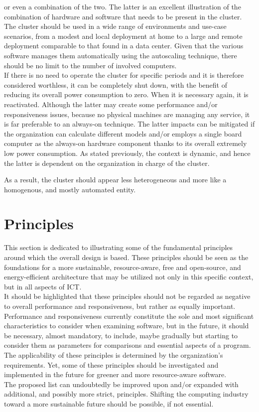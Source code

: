 or even a combination of the two. The latter is an excellent illustration of the
combination of hardware and software that needs to be present in the cluster. \\ %
The cluster should be used in a wide range of environments and use-case scenarios,
from a modest and local deployment at home to a large and remote deployment
comparable to that found in a data center. Given that the various software manages
them automatically using the autoscaling technique, there should be no limit to
the number of involved computers. \\ %
If there is no need to operate the cluster for specific periods and it is
therefore considered worthless, it can be completely shut down, with the benefit
of reducing its overall power consumption to zero. When it is necessary again,
it is reactivated. Although the latter may create some performance and/or responsiveness
issues, because no physical machines are managing any service, it is far preferable
to an always-on technique. The latter impacts can be mitigated if the
organization can calculate different models and/or employs a single board
computer as the always-on hardware component thanks to its overall extremely low
power consumption. As stated previously, the context is dynamic, and hence the latter
is dependent on the organization in charge of the cluster.

As a result, the cluster should appear less heterogeneous and more like a
homogenous, and mostly automated entity.

\section{Principles}
\label{sec:introduction_principles}

This section is dedicated to illustrating some of the fundamental principles
around which the overall design is based. These principles should be seen as the
foundations for a more sustainable, resource-aware, free and open-source, and
energy-efficient architecture that may be utilized not only in this specific
context, but in all aspects of ICT. \\ %
It should be highlighted that these principles should not be regarded as negative
to overall performance and responsiveness, but rather as equally important. Performance
and responsiveness currently constitute the sole and most significant characteristics
to consider when examining software, but in the future, it should be necessary,
almost mandatory, to include, maybe gradually but starting to consider them as
parameters for comparisons and essential aspects of a program. \\ %
The applicability of these principles is determined by the organization's
requirements. Yet, some of these principles should be investigated and
implemented in the future for greener and more resource-aware software. \\ %
The proposed list can undoubtedly be improved upon and/or expanded with
additional, and possibly more strict, principles. Shifting the computing industry
toward a more sustainable future should be possible, if not essential.


